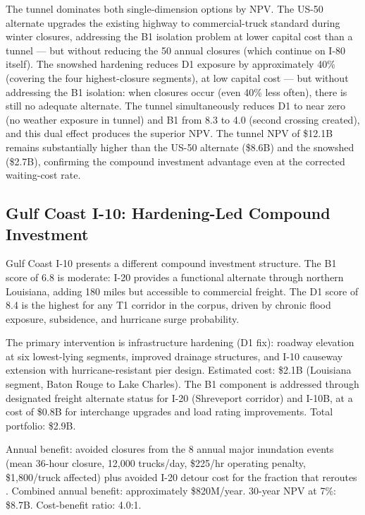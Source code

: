 The tunnel dominates both single-dimension options by NPV. The US-50 alternate upgrades the existing highway to commercial-truck standard during winter closures, addressing the B1 isolation problem at lower capital cost than a tunnel --- but without reducing the 50 annual closures (which continue on I-80 itself). The snowshed hardening reduces D1 exposure by approximately 40\% (covering the four highest-closure segments), at low capital cost --- but without addressing the B1 isolation: when closures occur (even 40\% less often), there is still no adequate alternate. The tunnel simultaneously reduces D1 to near zero (no weather exposure in tunnel) and B1 from 8.3 to 4.0 (second crossing created), and this dual effect produces the superior NPV. The tunnel NPV of \$12.1B remains substantially higher than the US-50 alternate (\$8.6B) and the snowshed (\$2.7B), confirming the compound investment advantage even at the corrected waiting-cost rate.

\subsection{Gulf Coast I-10: Hardening-Led Compound Investment}

Gulf Coast I-10 presents a different compound investment structure. The B1 score of 6.8 is moderate: I-20 provides a functional alternate through northern Louisiana, adding 180 miles but accessible to commercial freight. The D1 score of 8.4 is the highest for any T1 corridor in the corpus, driven by chronic flood exposure, subsidence, and hurricane surge probability.

The primary intervention is infrastructure hardening (D1 fix): roadway elevation at six lowest-lying segments, improved drainage structures, and I-10 causeway extension with hurricane-resistant pier design. Estimated cost: \$2.1B (Louisiana segment, Baton Rouge to Lake Charles). The B1 component is addressed through designated freight alternate status for I-20 (Shreveport corridor) and I-10B, at a cost of \$0.8B for interchange upgrades and load rating improvements. Total portfolio: \$2.9B.

Annual benefit: avoided closures from the 8 annual major inundation events (mean 36-hour closure, 12,000 trucks/day, \$225/hr operating penalty, \$1,800/truck affected) plus avoided I-20 detour cost for the fraction that reroutes \citep{ATRI_costs2024}. Combined annual benefit: approximately \$820M/year. 30-year NPV at 7\%: \$8.7B. Cost-benefit ratio: 4.0:1.

